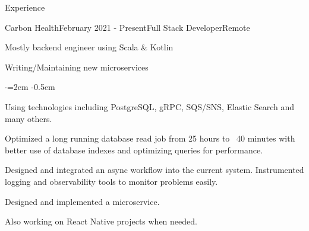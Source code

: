 \documentclass{resume} %
\begin{document}
\begin{rSection}{Experience}

\begin{rSubsection}{Carbon Health}{February 2021 - Present}{Full Stack Developer}{Remote}
\item Mostly backend engineer using Scala \& Kotlin
\item Writing/Maintaining new microservices
\begin{list}{$\cdot$}{\leftmargin=2em}
\itemsep -0.5em \vspace{-0.5em} %
    \item Using technologies including PostgreSQL, gRPC, SQS/SNS, Elastic Search and many others.
    \item Optimized a long running database read job from 25 hours to ~40 minutes with better use of database indexes and optimizing queries for performance.
    \item Designed and integrated an async workflow into the current system. Instrumented logging and observability tools to monitor problems easily.
    \item Designed and implemented a microservice.    
\end{list}
\item Also working on React Native projects when needed.
\end{rSubsection}



\end{rSection}
\end{document}
